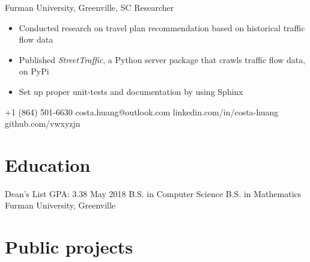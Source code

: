 \documentclass{tccv}
\begin{document}
\begin{eventlist}
     {Furman University, Greenville, SC}
     {Researcher}
\begin{itemize}
    \item Conducted research on travel plan recommendation based on
historical traffic flow data
    \item Published \textit{StreetTraffic}, a Python server package that crawls traffic flow data, on PyPi
    \item Set up proper unit-tests and documentation by using Sphinx
\end{itemize}



\end{eventlist}

    {+1 (864) 501-6630}
    {costa.huang@outlook.com}
    {linkedin.com/in/costa-huang}
    {github.com/vwxyzjn}

\section{Education}

\begin{yearlist}

\item[Dean's List \newline GPA: 3.38]{May 2018}
     {B.S. in Computer Science \newline B.S. in Mathematics}
     {Furman University, Greenville}

\end{yearlist}

\section{Public projects}
\end{document}

